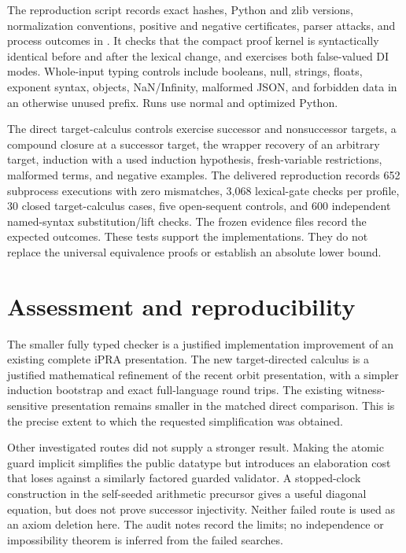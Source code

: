\documentclass[11pt,a4paper]{article}
\theoremstyle{definition}\newtheorem{definition}[theorem]{Definition}
\begin{document}
The reproduction script records exact hashes, Python and zlib versions,
normalization conventions, positive and negative certificates, parser
attacks, and process outcomes in . It checks that the
compact proof kernel is syntactically identical before and after the
lexical change, and exercises both false-valued DI modes. Whole-input
typing controls include booleans, null, strings, floats, exponent syntax,
objects, NaN/Infinity, malformed JSON, and forbidden data in an otherwise
unused prefix. Runs use normal and optimized Python.

The direct target-calculus controls exercise successor and nonsuccessor
targets, a compound closure at a successor target, the wrapper recovery
of an arbitrary target, induction with a used induction hypothesis,
fresh-variable restrictions, malformed terms, and negative examples.
The delivered reproduction records 652 subprocess executions with zero
mismatches, 3,068 lexical-gate checks per profile, 30 closed target-calculus
cases, five open-sequent controls, and 600 independent named-syntax
substitution/lift checks. The frozen evidence files record the expected
outcomes. These tests support the implementations. They do not replace
the universal equivalence proofs or establish an absolute lower bound.

\section{Assessment and reproducibility}
\label{sec:assessment}

The smaller fully typed checker is a justified implementation improvement
of an existing complete iPRA presentation. The new target-directed
calculus is a justified mathematical refinement of the recent orbit
presentation, with a simpler induction bootstrap and exact full-language
round trips. The existing witness-sensitive presentation remains smaller
in the matched direct comparison. This is the precise extent to which the
requested simplification was obtained.

Other investigated routes did not supply a stronger result. Making the
atomic guard implicit simplifies the public datatype but introduces an
elaboration cost that loses against a similarly factored guarded
validator. A stopped-clock construction in the self-seeded arithmetic
precursor gives a useful diagonal equation, but does not prove successor
injectivity. Neither failed route is used as an axiom deletion here.
The audit notes record the limits; no independence or impossibility
theorem is inferred from the failed searches.
\end{document}
